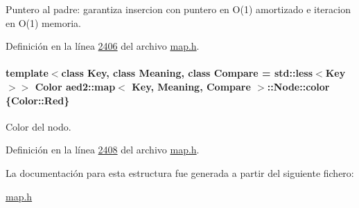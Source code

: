 Puntero al padre\+: garantiza insercion con puntero en O(1) amortizado e iteracion en O(1) memoria. 



Definición en la línea \hyperlink{map_8h_source_l02406}{2406} del archivo \hyperlink{map_8h_source}{map.\+h}.

\paragraph[{\texorpdfstring{color}{color}}]{\setlength{\rightskip}{0pt plus 5cm}template$<$class Key, class Meaning, class Compare = std\+::less$<$\+Key$>$$>$ {\bf Color} {\bf aed2\+::map}$<$ Key, Meaning, Compare $>$\+::Node\+::color \{Color\+::\+Red\}}\hypertarget{structaed2_1_1map_1_1Node_a58dd9993fee8ee3eaa5716b72a3eca47_a58dd9993fee8ee3eaa5716b72a3eca47}{}\label{structaed2_1_1map_1_1Node_a58dd9993fee8ee3eaa5716b72a3eca47_a58dd9993fee8ee3eaa5716b72a3eca47}


Color del nodo. 



Definición en la línea \hyperlink{map_8h_source_l02408}{2408} del archivo \hyperlink{map_8h_source}{map.\+h}.



La documentación para esta estructura fue generada a partir del siguiente fichero\+:\begin{DoxyCompactItemize}
\item 
\hyperlink{map_8h}{map.\+h}\end{DoxyCompactItemize}
